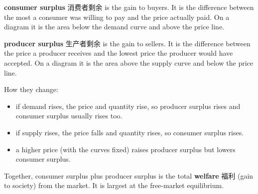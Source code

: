 \documentclass[11pt]{article}
\begin{document}
\textbf{consumer surplus} 消费者剩余 is the gain to buyers. It is the difference between the most a consumer was willing to pay and the price actually paid. On a diagram it is the area below the demand curve and above the price line.

\textbf{producer surplus} 生产者剩余 is the gain to sellers. It is the difference between the price a producer receives and the lowest price the producer would have accepted. On a diagram it is the area above the supply curve and below the price line.

How they change:

\begin{itemize}
\item if demand rises, the price and quantity rise, so producer surplus rises and consumer surplus usually rises too.

\item if supply rises, the price falls and quantity rises, so consumer surplus rises.

\item a higher price (with the curves fixed) raises producer surplus but lowers consumer surplus.

\end{itemize}

Together, consumer surplus plus producer surplus is the total \textbf{welfare} 福利 (gain to society) from the market. It is largest at the free-market equilibrium.
\end{document}
